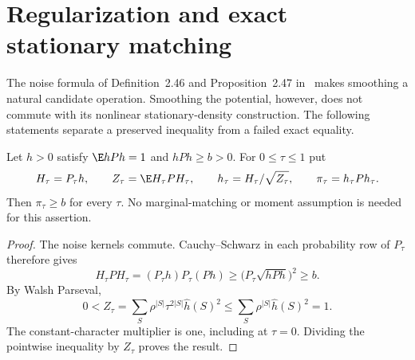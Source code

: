 \section{Regularization and exact stationary matching}\label{regularization}
The noise formula of Definition~2.46 and Proposition~2.47
in~\cite{odonnell} makes smoothing a natural candidate operation.
Smoothing the potential, however, does not commute with its nonlinear
stationary-density construction. The following statements separate a
preserved inequality from a failed exact equality.

\begin{proposition}\label{smoothingfloor}
Let $h>0$ satisfy $\E hPh=1$ and $hPh\geq b>0$. For $0\leq\tau\leq1$ put
\[
 H_\tau=P_\tau h,\qquad Z_\tau=\E H_\tau P H_\tau,\qquad
 h_\tau=H_\tau/\sqrt{Z_\tau},\qquad \pi_\tau=h_\tau P h_\tau.
\]
Then $\pi_\tau\geq b$ for every $\tau$. No marginal-matching or moment
assumption is needed for this assertion.
\end{proposition}
\begin{proof}
The noise kernels commute. Cauchy--Schwarz in each probability row of
$P_\tau$ therefore gives
\[
 H_\tau P H_\tau=(P_\tau h)P_\tau(Ph)
 \geq\bigl(P_\tau\sqrt{hPh}\bigr)^2\geq b.
\]
By Walsh Parseval,
\[
 0<Z_\tau=\sum_S\rho^{|S|}\tau^{2|S|}\widehat h(S)^2
 \leq\sum_S\rho^{|S|}\widehat h(S)^2=1.
\]
The constant-character multiplier is one, including at $\tau=0$.
Dividing the pointwise inequality by $Z_\tau$ proves the result.
\end{proof}

